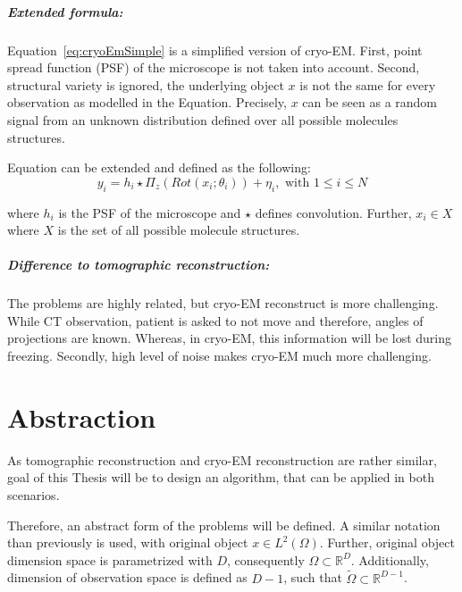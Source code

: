 \subparagraph{Extended formula:} 
Equation~\ref{eq:cryoEmSimple} is a simplified version of cryo-EM.
First, point spread function (PSF) of the microscope is not taken into account.
Second, structural variety is ignored, the underlying object $x$ is not the same 
for every observation as modelled in the Equation. 
Precisely, $x$ can be seen as a random signal from an unknown distribution defined over all possible molecules structures.

Equation can be extended and defined as the following:
\begin{equation}
    \label{eq:cryoEmExtended}
    y_i = h_i \star \Pi_z ( \textit{Rot} (x_i; \theta_i)) + \eta_i, \text{ with } 1 \leq i \leq N
\end{equation}

where $h_i$ is the PSF of the microscope and $\star$ defines convolution.
Further, $x_i \in X$ where $X$ is the set of all possible molecule structures.


\subparagraph{Difference to tomographic reconstruction:}
The problems are highly related, but cryo-EM reconstruct is more challenging.
While CT observation, patient is asked to not move and therefore, angles of projections are known.
Whereas, in cryo-EM, this information will be lost during freezing.
Secondly, high level of noise makes cryo-EM much more challenging.

\clearpage

\section{Abstraction}

\label{sec:abstract_form}
As tomographic reconstruction and cryo-EM reconstruction are rather similar, 
goal of this Thesis will be to design an algorithm, that can be applied in both scenarios.

Therefore, an abstract form of the problems will be defined.
A similar notation than previously is used, with original object $x \in L^2(\Omega)$.
Further, original object dimension space is parametrized with $D$, consequently $\Omega \subset \mathbb{R}^D$.
Additionally, dimension of observation space is defined as $D-1$, such that 
$\tilde{\Omega} \subset \mathbb{R}^{D-1}$.


